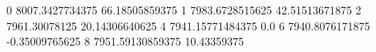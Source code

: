 0 8007.3427734375 66.18505859375
1 7983.6728515625 42.51513671875
2 7961.30078125 20.14306640625
4 7941.15771484375 0.0
6 7940.8076171875 -0.35009765625
8 7951.59130859375 10.43359375
